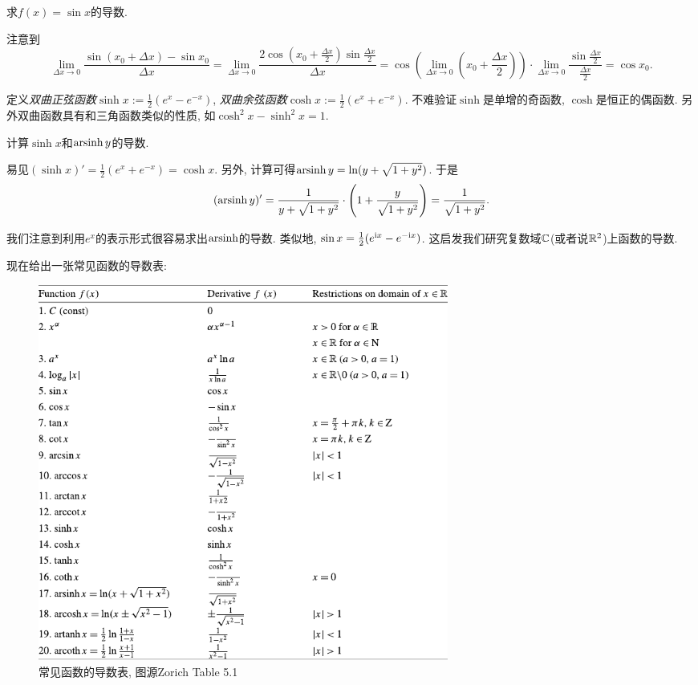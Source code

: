 \begin{example}
	求$f(x)= \sin x$的导数. 
\end{example}
\begin{solution}
	注意到$$\lim_{\Delta x \to 0} \frac{\sin (x_0+\Delta x) - \sin x_0}{\Delta x} = \lim_{\Delta x \to 0} \frac{2\cos (x_0+\frac{\Delta x}{2}) \sin \frac{\Delta x}{2}}{\Delta x} = \cos \left( \lim_{\Delta x \to 0}\left( x_0+\frac{\Delta x}{2} \right) \right) \cdot \lim_{\Delta x \to 0} \frac{\sin \frac{\Delta x}{2}}{\frac{\Delta x}{2}} = \cos x_0. $$
\end{solution}

\begin{example}
	定义\textit{双曲正弦函数}$\sinh x:= \frac{1}{2}(e^x-e^{-x})$, \textit{双曲余弦函数}$\cosh x := \frac{1}{2}(e^x+e^{-x})$. 不难验证$\sinh$是单增的奇函数, $\cosh$是恒正的偶函数. 另外双曲函数具有和三角函数类似的性质, 如$\cosh ^2x - \sinh ^2x = 1$. 
	
	计算$\sinh x$和$\operatorname{arsinh} y$的导数. 
\end{example}
\begin{solution}
	易见$(\sinh x)'=\frac{1}{2}(e^x+e^{-x})=\cosh x$. 另外, 计算可得$\operatorname{arsinh} y = \ln (y+\sqrt{1+y^2})$. 于是$$(\operatorname{arsinh} y)' = \frac{1}{y+\sqrt{1+y^2}} \cdot \left( 1+\frac{y}{\sqrt{1+y^2}} \right) = \frac{1}{\sqrt{1+y^2}}. $$
\end{solution}
\begin{remark}
	我们注意到利用$e^x$的表示形式很容易求出$\operatorname{arsinh}$的导数. 类似地, $\sin x = \frac{1}{2}(e^{\mathrm{i} x} - e^{-\mathrm{i} x})$. 这启发我们研究复数域$\mathbb{C}$(或者说$\mathbb{R} ^2$)上函数的导数. 
\end{remark}

现在给出一张常见函数的导数表: 

\begin{figure}[H]
	\centering
	\includegraphics[width=13.5cm]{attachment/常见函数的导数.pdf}
	\caption{常见函数的导数表, 图源Zorich Table 5.1}
\end{figure}

